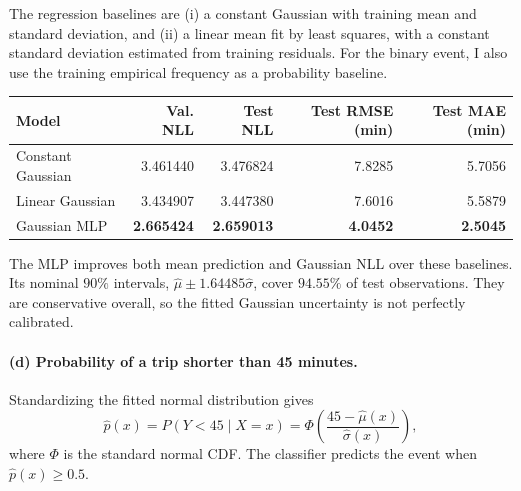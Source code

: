 The regression baselines are (i) a constant Gaussian with training mean and standard deviation, and (ii) a linear mean fit by least squares, with a constant standard deviation estimated from training residuals. For the binary event, I also use the training empirical frequency as a probability baseline.

\begin{center}
\begin{tabular}{lrrrr}
\toprule
Model & Val. NLL & Test NLL & Test RMSE (min) & Test MAE (min)\\
\midrule
Constant Gaussian & 3.461440 & 3.476824 & 7.8285 & 5.7056\\
Linear Gaussian & 3.434907 & 3.447380 & 7.6016 & 5.5879\\
Gaussian MLP & \textbf{2.665424} & \textbf{2.659013} & \textbf{4.0452} & \textbf{2.5045}\\
\bottomrule
\end{tabular}
\end{center}
The MLP improves both mean prediction and Gaussian NLL over these baselines. Its nominal $90\%$ intervals, $\widehat\mu\pm1.64485\widehat\sigma$, cover $94.55\%$ of test observations. They are conservative overall, so the fitted Gaussian uncertainty is not perfectly calibrated.

\newpage
\paragraph{(d) Probability of a trip shorter than 45 minutes.} Standardizing the fitted normal distribution gives
\[
\widehat p(x)=P(Y<45\mid X=x)
=\Phi\!\left(\frac{45-\widehat\mu(x)}{\widehat\sigma(x)}\right),
\]
where $\Phi$ is the standard normal CDF. The classifier predicts the event when $\widehat p(x)\geq0.5$.

